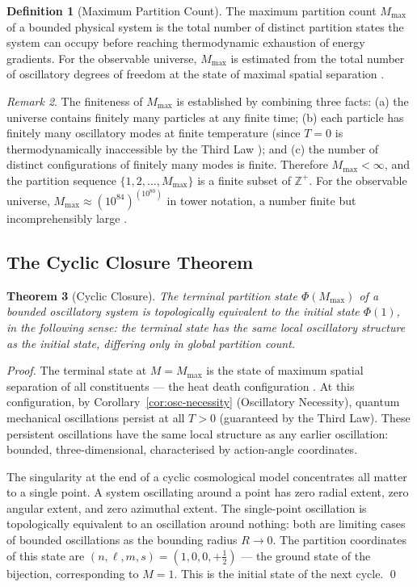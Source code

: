 \documentclass[twocolumn,10pt,a4paper]{article}
\theoremstyle{thmstyle}
\newtheorem{theorem}{Theorem}[section]
\theoremstyle{definition}
\newtheorem{definition}[theorem]{Definition}
\theoremstyle{remark}
\newtheorem{remark}[theorem]{Remark}
\newcommand{\Zp}{\mathbb{Z}^{+}}
\newcommand{\Mmax}{M_{\max}}
\newcommand{\PhiMap}{\varPhi}
\begin{document}
\begin{definition}[Maximum Partition Count]
\label{def:mmax}
The maximum partition count $\Mmax$ of a bounded physical system is the total number of distinct partition states the system can occupy before reaching thermodynamic exhaustion of energy gradients. For the observable universe, $\Mmax$ is estimated from the total number of oscillatory degrees of freedom at the state of maximal spatial separation \citep{penrose2004,kelvin1852,gibbs1902}.
\end{definition}

\begin{remark}
The finiteness of $\Mmax$ is established by combining three facts: (a) the universe contains finitely many particles at any finite time; (b) each particle has finitely many oscillatory modes at finite temperature (since $T = 0$ is thermodynamically inaccessible by the Third Law \citep{planck1900}); and (c) the number of distinct configurations of finitely many modes is finite. Therefore $\Mmax < \infty$, and the partition sequence $\{1, 2, \ldots, \Mmax\}$ is a finite subset of $\Zp$. For the observable universe, $\Mmax \approx (10^{84})^{(10^{80})}$ in tower notation, a number finite but incomprehensibly large \citep{penrose2004}.
\end{remark}

\subsection{The Cyclic Closure Theorem}

\begin{theorem}[Cyclic Closure]
\label{thm:cyclic}
The terminal partition state $\PhiMap(\Mmax)$ of a bounded oscillatory system is topologically equivalent to the initial state $\PhiMap(1)$, in the following sense: the terminal state has the same local oscillatory structure as the initial state, differing only in global partition count.
\end{theorem}

\begin{proof}
The terminal state at $M = \Mmax$ is the state of maximum spatial separation of all constituents --- the heat death configuration \citep{kelvin1852}. At this configuration, by Corollary~\ref{cor:osc-necessity} (Oscillatory Necessity), quantum mechanical oscillations persist at all $T > 0$ (guaranteed by the Third Law). These persistent oscillations have the same local structure as any earlier oscillation: bounded, three-dimensional, characterised by action-angle coordinates.

The singularity at the end of a cyclic cosmological model \citep{penrose2010} concentrates all matter to a single point. A system oscillating around a point has zero radial extent, zero angular extent, and zero azimuthal extent. The single-point oscillation is topologically equivalent to an oscillation around nothing: both are limiting cases of bounded oscillations as the bounding radius $R \to 0$. The partition coordinates of this state are $(n, \ell, m, s) = (1, 0, 0, +\tfrac{1}{2})$ --- the ground state of the bijection, corresponding to $M = 1$. This is the initial state of the next cycle. \qed
\end{proof}
\end{document}
